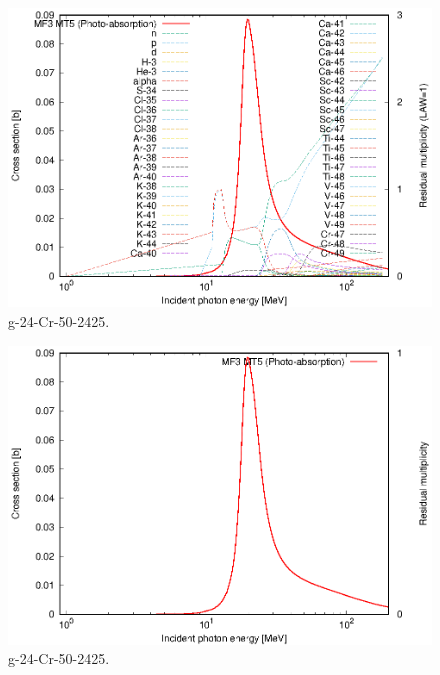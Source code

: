 \begin{figure}
 \includegraphics[width=\linewidth]{eps/g_24-Cr-50_2425.eps}
  \caption{g-24-Cr-50-2425.}
\end{figure}
\begin{figure}
 \includegraphics[width=\linewidth]{eps-law0/g_24-Cr-50_2425.eps}
 \caption{g-24-Cr-50-2425.}
\end{figure}
\newpage \clearpage

